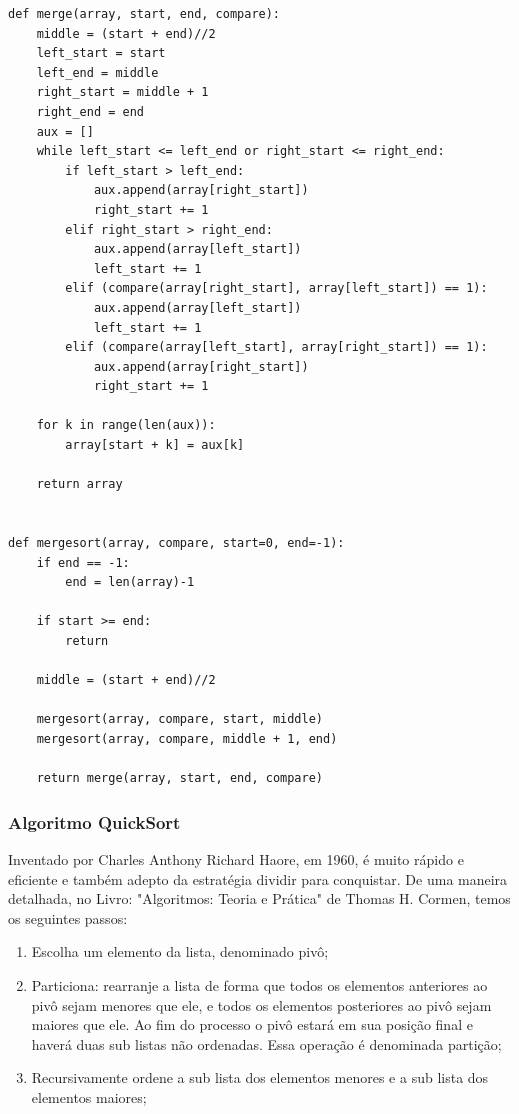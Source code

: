 \documentclass[a4paper,12pt]{scrartcl}
\begin{document}
\begin{lstlisting}
def merge(array, start, end, compare):
    middle = (start + end)//2
    left_start = start
    left_end = middle
    right_start = middle + 1
    right_end = end
    aux = []
    while left_start <= left_end or right_start <= right_end:
        if left_start > left_end:
            aux.append(array[right_start])
            right_start += 1
        elif right_start > right_end:
            aux.append(array[left_start])
            left_start += 1
        elif (compare(array[right_start], array[left_start]) == 1):
            aux.append(array[left_start])
            left_start += 1
        elif (compare(array[left_start], array[right_start]) == 1):
            aux.append(array[right_start])
            right_start += 1
    
    for k in range(len(aux)):
        array[start + k] = aux[k]
    
    return array


def mergesort(array, compare, start=0, end=-1):
    if end == -1:
        end = len(array)-1
    
    if start >= end:
        return
    
    middle = (start + end)//2

    mergesort(array, compare, start, middle)
    mergesort(array, compare, middle + 1, end)
    
    return merge(array, start, end, compare)
\end{lstlisting}

\subsubsection{Algoritmo QuickSort}
Inventado por Charles Anthony Richard Haore, em 1960, é muito rápido e eficiente e também adepto da estratégia dividir para conquistar. De uma maneira detalhada, no Livro: "Algoritmos: Teoria e Prática" de Thomas H. Cormen, temos os seguintes passos:

\begin{enumerate}
    \item Escolha um elemento da lista, denominado pivô; 
    \item Particiona: rearranje a lista de forma que todos os elementos anteriores ao pivô sejam menores que ele, e todos os elementos posteriores ao pivô sejam maiores que ele. Ao fim do processo o pivô estará em sua posição final e haverá duas sub listas não ordenadas. Essa operação é denominada partição;
    \item Recursivamente ordene a sub lista dos elementos menores e a sub lista dos elementos maiores;
\end{enumerate}
\end{document}
